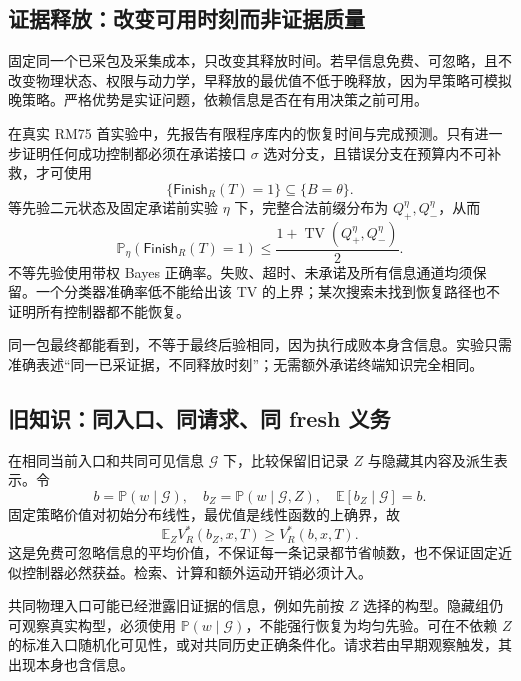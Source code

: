 \documentclass[11pt,a4paper,fontset=fandol]{ctexart}
\theoremstyle{definition}\newtheorem{definition}[theorem]{定义}
\theoremstyle{remark}\newtheorem{remark}[theorem]{说明}
\numberwithin{equation}{section}
\newcommand{\E}{\mathbb E}\newcommand{\Prb}{\mathbb P}
\newcommand{\TV}{\operatorname{TV}}\newcommand{\osc}{\operatorname{osc}}
\newcommand{\Finish}{\mathsf{Finish}}\newcommand{\ind}{\mathbf 1}
\begin{document}
\subsection{证据释放：改变可用时刻而非证据质量}
固定同一个已采包及采集成本，只改变其释放时间。若早信息免费、可忽略，且不改变物理状态、权限与动力学，早释放的最优值不低于晚释放，因为早策略可模拟晚策略。严格优势是实证问题，依赖信息是否在有用决策之前可用。

在真实 RM75 首实验中，先报告有限程序库内的恢复时间与完成预测。只有进一步证明任何成功控制都必须在承诺接口 $\sigma$ 选对分支，且错误分支在预算内不可补救，才可使用
\begin{equation}
 \{\Finish_R(T)=1\}\subseteq\{B=\theta\}.
\end{equation}
等先验二元状态及固定承诺前实验 $\eta$ 下，完整合法前缀分布为 $Q_+^\eta,Q_-^\eta$，从而
\begin{equation}
 \Prb_\eta(\Finish_R(T)=1)\le
 \frac{1+\TV(Q_+^\eta,Q_-^\eta)}2.
 \label{eq:timing-upper}
\end{equation}
不等先验使用带权 Bayes 正确率。失败、超时、未承诺及所有信息通道均须保留。一个分类器准确率低不能给出该 TV 的上界；某次搜索未找到恢复路径也不证明所有控制器都不能恢复。

同一包最终都能看到，不等于最终后验相同，因为执行成败本身含信息。实验只需准确表述“同一已采证据，不同释放时刻”；无需额外承诺终端知识完全相同。

\subsection{旧知识：同入口、同请求、同 fresh 义务}
在相同当前入口和共同可见信息 $\mathcal G$ 下，比较保留旧记录 $Z$ 与隐藏其内容及派生表示。令
\begin{equation}
 b=\Prb(w\mid\mathcal G),\quad b_Z=\Prb(w\mid\mathcal G,Z),\quad
 \E[b_Z\mid\mathcal G]=b.
\end{equation}
固定策略价值对初始分布线性，最优值是线性函数的上确界，故
\begin{equation}
 \E_Z V_R^*(b_Z,x,T)\ge V_R^*(b,x,T).
 \label{eq:reuse}
\end{equation}
这是免费可忽略信息的平均价值，不保证每一条记录都节省帧数，也不保证固定近似控制器必然获益。检索、计算和额外运动开销必须计入。

共同物理入口可能已经泄露旧证据的信息，例如先前按 $Z$ 选择的构型。隐藏组仍可观察真实构型，必须使用 $\Prb(w\mid\mathcal G)$，不能强行恢复为均匀先验。可在不依赖 $Z$ 的标准入口随机化可见性，或对共同历史正确条件化。请求若由早期观察触发，其出现本身也含信息。
\end{document}
